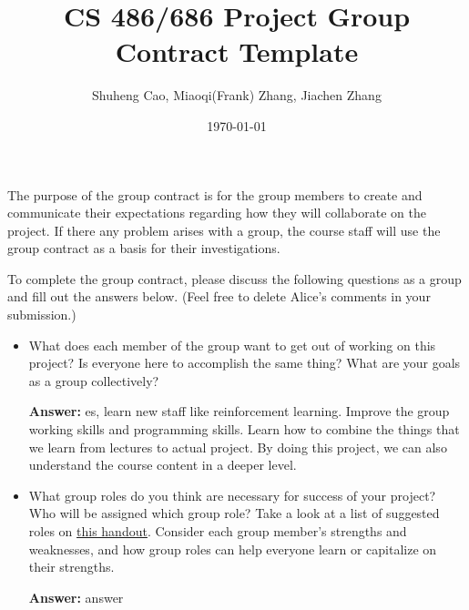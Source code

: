 \documentclass[12pt]{article}
\title{CS 486/686 Project Group Contract Template}
\author{Shuheng Cao, Miaoqi(Frank) Zhang, Jiachen Zhang}
\date{\today}
\newenvironment{answer}[1]{
\color{blue}
	{\bf Answer:}
}{
}
\begin{document}
\maketitle

The purpose of the group contract is for the group members to create and communicate their expectations regarding how they will collaborate on the project.  If there any problem arises with a group, the course staff will use the group contract as a basis for their investigations.

To complete the group contract, please discuss the following questions as a group and fill out the answers below. (Feel free to delete Alice's comments in your submission.)

\begin{itemize}
\item What does each member of the group want to get out of working on this project? Is everyone here to accomplish the same thing? What are your goals as a group collectively?

\begin{answer}

Yes, learn new staff like reinforcement learning. Improve the group working skills and programming skills. Learn how to combine the things that we learn from lectures to actual project. By doing this project, we can also understand the course content in a deeper level.
\end{answer}

\item What group roles do you think are necessary for success of your project? Who will be assigned which group role? Take a look at a list of suggested roles on \href{https://uwaterloo.ca/student-success/sites/ca.student-success/files/uploads/files/TipSheet_GroupWork_0.pdf}{this handout}.  Consider each group member's strengths and weaknesses, and how group roles can help everyone learn or capitalize on their strengths.

\begin{answer}


\end{answer}
\end{itemize}
\end{document}
